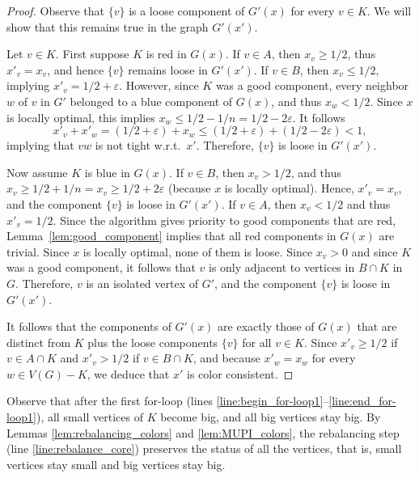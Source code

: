 \documentclass{article} \usepackage{fullpage}
\begin{document}
\begin{proof}
Observe that $\{v\}$ is a loose component of $G'(x)$ for every $v\in K$. We will show that this remains true in the graph $G'(x')$.

Let $v\in K$. First suppose $K$ is red in $G(x)$. If $v\in A$, then $x_{v} \geq 1/2$, thus
$x'_{v}=x_{v}$, and hence $\{v\}$ remains loose in $G'(x')$. If $v\in B$, then $x_{v} \leq 1/2$,
implying $x'_{v} = 1/2 + \varepsilon$. However, since $K$ was a good component, 
every neighbor $w$ of $v$ in $G'$ belonged to a blue component of $G(x)$, and 
thus $x_{w} < 1/2$. Since $x$ is locally optimal, this implies 
$x_{w} \leq 1/2 - 1/n = 1/2 - 2\varepsilon$.
It follows
$$
x'_{v} + x'_{w} = (1/2 +\varepsilon) + x_{w} \leq (1/2 +\varepsilon) + (1/2 - 2\varepsilon) < 1,
$$
implying that $vw$ is not tight w.r.t.\ $x'$. Therefore, $\{v\}$ is loose in $G'(x')$.

Now assume $K$ is blue in $G(x)$. If $v\in B$, then $x_{v} > 1/2$, and thus 
$x_{v} \geq 1/2 + 1/n = x_{v} \geq 1/2 + 2\varepsilon$ (because $x$ is locally optimal). Hence, 
$x'_{v} = x_{v}$, and the component $\{v\}$ is loose in $G'(x')$.
If $v\in A$, then $x_{v} < 1/2$ and thus $x'_{v} = 1/2$.
Since the algorithm gives priority to good components that are red, Lemma~\ref{lem:good_component}
implies that all red components in $G(x)$ are trivial. 
Since $x$ is locally optimal, none of them is loose.
Since $x_{v} > 0$ and since $K$ was a good component, it follows that $v$ is only adjacent to 
vertices in $B\cap K$ in $G$. Therefore, $v$ is an isolated vertex of $G'$, and the component
$\{v\}$ is loose in $G'(x')$.  

It follows that the components of $G'(x)$ are exactly those of $G(x)$ that are distinct from $K$ 
plus the loose components $\{v\}$ for all $v\in K$. Since 
$x'_{v} \geq 1/2$ if $v \in A \cap K$ and $x'_{v} > 1/2$ if $v \in B \cap K$, and 
because $x'_{w} = x_{w}$ for every $w \in V(G) - K$, we deduce that $x'$ is color consistent. 
\end{proof}

Observe that after the first for-loop (lines \ref{line:begin_for-loop1}--\ref{line:end_for-loop1}), all small vertices of $K$ become big, and all big vertices stay big. By Lemmas \ref{lem:rebalancing_colors} and \ref{lem:MUPI_colors}, the rebalancing step (line \ref{line:rebalance_core}) preserves the status of all the vertices, that is, small vertices stay small and big vertices stay big.
\end{document}

